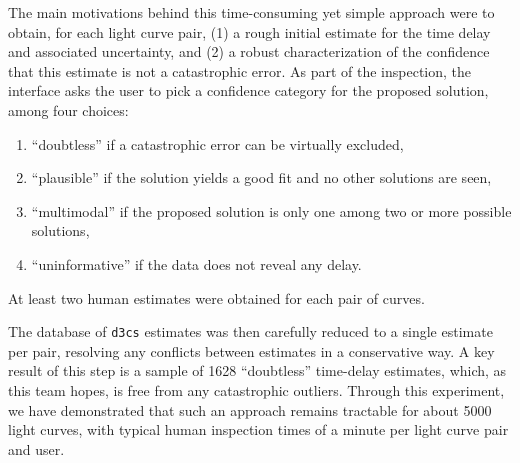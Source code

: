 \documentclass[traditabstract]{aa}
\begin{document}

The main motivations behind this time-consuming yet simple
approach were to obtain, for each light curve pair, (1) a rough
initial estimate for the time delay and associated uncertainty, and
(2) a robust characterization of the confidence that this estimate is
not a catastrophic error. 
As part of the inspection, the interface asks the user to pick a
confidence category for the proposed solution, among four choices:


\begin{enumerate}
\item ``doubtless'' if a catastrophic error can be virtually excluded,
\item ``plausible'' if the solution yields a good fit and no other solutions are seen,
\item ``multimodal'' if the proposed solution is only one among two or more possible solutions,
\item ``uninformative'' if the data does not reveal any delay.
\end{enumerate}

At least two human estimates were obtained for each pair of curves.


The database of {\tt d3cs}
estimates was then carefully reduced to a single estimate per pair,
resolving any conflicts between estimates in a conservative way. A key
result of this step is a sample of 1628 ``doubtless'' time-delay
estimates, which, as this team hopes, is free from any catastrophic
outliers. Through this experiment, we have demonstrated that such an
approach remains tractable for about 5000 light curves, with typical
human inspection times of a minute per light curve pair and user.
\end{document}
